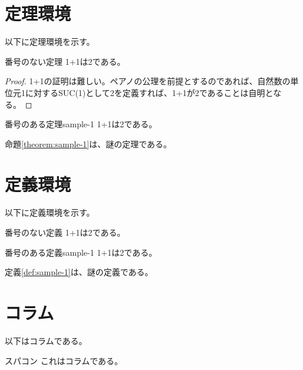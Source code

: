 \section{定理環境}
以下に定理環境を示す。
\begin{theorem*}{番号のない定理}
	1+1は2である。
\end{theorem*}
\begin{proof}
	1+1の証明は難しい。ペアノの公理を前提とするのであれば、自然数の単位元1に対するSUC(1)として2を定義すれば、1+1が2であることは自明となる。
\end{proof}
\begin{theorem}{番号のある定理}{sample-1}
	1+1は2である。
\end{theorem}
命題\ref{theorem:sample-1}は、謎の定理である。

\section{定義環境}
以下に定義環境を示す。
\begin{definition*}{番号のない定義}
	1+1は2である。
\end{definition*}

\begin{definition}{番号のある定義}{sample-1}
	1+1は2である。
\end{definition}
定義\ref{def:sample-1}は、謎の定義である。

\section{コラム}
以下はコラムである。
\begin{column*}{スパコン}
	これはコラムである。
\end{column*}

